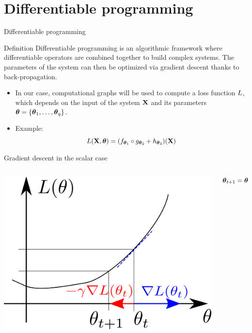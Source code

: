 \documentclass[xcolor=pdftex,dvipsnames,table,mathserif]{beamer}
\begin{document}
\section{Differentiable programming}


\begin{frame}{Differentiable programming}

\begin{block}{Definition}
  Differentiable programming is an algorithmic framework where differentiable operators are combined together to build complex systems. The parameters of the system can then be optimized via gradient descent thanks to \alert{back-propagation}.
\end{block}

\begin{itemize}
\item In our case, computational graphs will be used to compute a \alert{loss} function $L$, which depends on the input of the system $\mathbf{X}$ and its parameters $\boldsymbol{\theta} = \{\boldsymbol{\theta}_1, \ldots, \boldsymbol{\theta}_q\}$.
\item Example:
  \[
  L(\mathbf{X}, \boldsymbol{\theta}) = (f_{\boldsymbol{\theta}_1} \circ g_{\boldsymbol{\theta}_2} + h_{\boldsymbol{\theta}_3}) (\mathbf{X})
  \]

\end{itemize}

\end{frame}
\begin{frame}{Gradient descent in the scalar case}

\begin{columns}
  \begin{column}{.5\textwidth}
    \includegraphics[width=\textwidth]{gradient_descent}
  \end{column}

  \begin{column}{.5\textwidth}
    \[
    \boldsymbol{\theta}_{t+1} = \boldsymbol{\theta}_t - \eta\nabla L(\boldsymbol{\theta}_t)
    \]
  \end{column}
\end{columns}

\end{frame}
\end{document}
